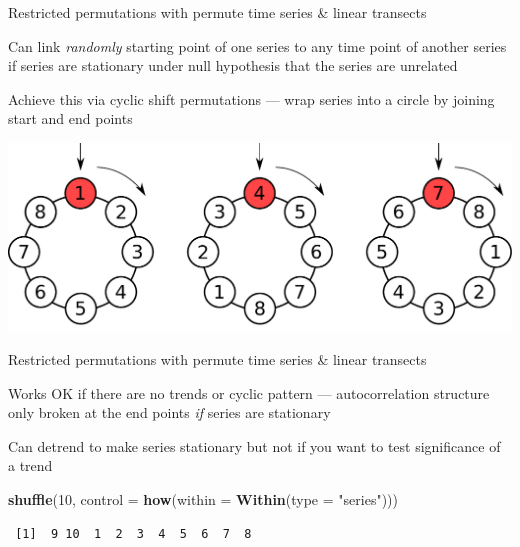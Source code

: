 \documentclass[10pt,ignorenonframetext,compress, aspectratio=169]{beamer}
\newenvironment{Shaded}{\begin{snugshade}}{\end{snugshade}}
\newcommand{\KeywordTok}[1]{\textcolor[rgb]{0.13,0.29,0.53}{\textbf{{#1}}}}
\newcommand{\DataTypeTok}[1]{\textcolor[rgb]{0.13,0.29,0.53}{{#1}}}
\newcommand{\DecValTok}[1]{\textcolor[rgb]{0.00,0.00,0.81}{{#1}}}
\newcommand{\StringTok}[1]{\textcolor[rgb]{0.31,0.60,0.02}{{#1}}}
\newcommand{\NormalTok}[1]{{#1}}
\begin{document}
\begin{frame}{Restricted permutations with permute \textbar{} time
series \& linear transects}

Can link \emph{randomly} starting point of one series to any time point
of another series if series are stationary under null hypothesis that
the series are unrelated

Achieve this via cyclic shift permutations --- wrap series into a circle
by joining start and end points

\includegraphics[width=\linewidth]{cyclic-shifts-figure}

\end{frame}

\begin{frame}[fragile]{Restricted permutations with permute \textbar{}
time series \& linear transects}

Works OK if there are no trends or cyclic pattern --- autocorrelation
structure only broken at the end points \emph{if} series are stationary

Can detrend to make series stationary but not if you want to test
significance of a trend

\scriptsize

\begin{Shaded}
\begin{Highlighting}[]
\KeywordTok{shuffle}\NormalTok{(}\DecValTok{10}\NormalTok{, }\DataTypeTok{control =} \KeywordTok{how}\NormalTok{(}\DataTypeTok{within =} \KeywordTok{Within}\NormalTok{(}\DataTypeTok{type =} \StringTok{"series"}\NormalTok{)))}
\end{Highlighting}
\end{Shaded}

\begin{verbatim}
 [1]  9 10  1  2  3  4  5  6  7  8
\end{verbatim}

\normalsize

\end{frame}
\end{document}
